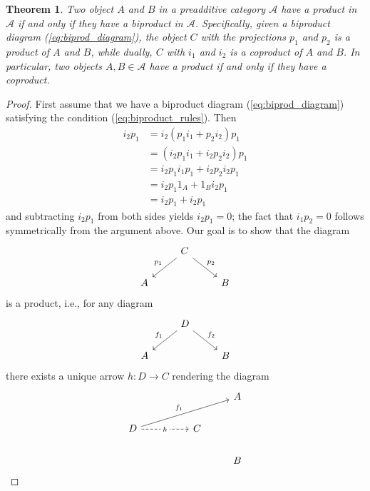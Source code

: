 \documentclass[10pt,oneside]{book}
\def\~#1{\mathscr{#1}}
\theoremstyle{plain}
\newtheorem{thm}{Theorem}[section]
\theoremstyle{definition}
\theoremstyle{remark}
\numberwithin{equation}{section}
\numberwithin{figure}{section}
\begin{document}
\begin{thm}
    Two object $A$ and $B$ in a preadditive category $\~A$ have a product in $\~A$ if and only if they have a biproduct in $\~A$. Specifically, given a biproduct diagram (\ref{eq:biprod_diagram}), the object $C$ with the projections $p_1$ and $p_2$ is a product of $A$ and $B$, while dually, $C$ with $i_1$ and $i_2$ is a coproduct of $A$ and $B$. In particular, two objects $A, B \in \~A$ have a product if and only if they have a coproduct.
\end{thm}

\begin{proof}
    First assume that we have a biproduct diagram (\ref{eq:biprod_diagram}) satisfying the condition (\ref{eq:biproduct_rules}). Then 
    \begin{align*}
        i_2p_1 &= i_2(p_1 i_1 + p_2 i_2) p_1 \\
               &= (i_2 p_1 i_1 + i_2 p_2 i_2)p_1 \\
               &= i_2 p_1 i_1 p_1 + i_2 p_2 i_2 p_1 \\
               &= i_2 p_1 1_A + 1_B i_2 p_1 \\
               &= i_2 p_1 + i_2 p_1
    \end{align*}
    and subtracting $i_2 p_1$ from both sides yields $i_2 p_1 = 0$; the fact that $i_1 p_2 = 0$ follows symmetrically from the argument above. Our goal is to show that the diagram 
    \[\begin{tikzcd}
        & C \\
        A && B
        \arrow["{p_1}"', from=1-2, to=2-1]
        \arrow["{p_2}", from=1-2, to=2-3]
    \end{tikzcd}\]
    is a product, i.e., for any diagram
    \begin{equation}
    \label{eq:span}
    \begin{tikzcd}
    & D \\
    A && B
    \arrow["{f_1}"', from=1-2, to=2-1]
    \arrow["{f_2}", from=1-2, to=2-3]
    \end{tikzcd}
    \end{equation}
    there exists a unique arrow $h: D \to C$ rendering the diagram
    \begin{equation}
    \label{eq:abproduct}
    \begin{tikzcd}
        &&& A \\
        D && C \\
        &&& B
        \arrow["{f_1}", from=2-1, to=1-4]
        \arrow["h"{description}, dashed, from=2-1, to=2-3]

\end{tikzcd}
\end{equation}
\end{proof}
\end{document}
